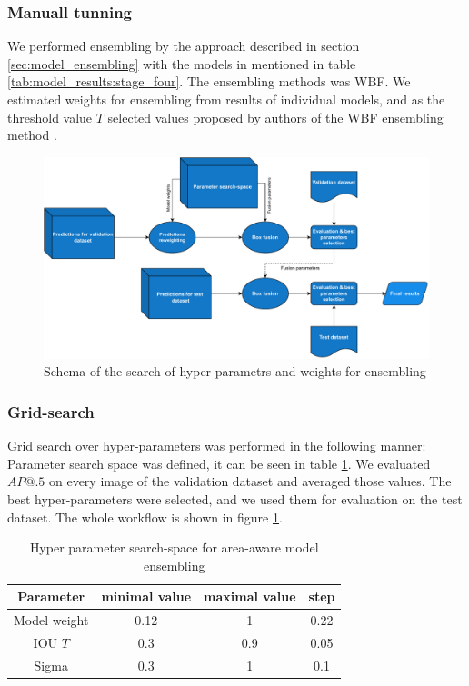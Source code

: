 \subsubsection{Manuall tunning}
We performed ensembling by the approach described in section \ref{sec:model_ensembling} with the models in mentioned in table \ref{tab:model_results:stage_four}. The ensembling methods was WBF. We estimated weights for ensembling from results of individual models, and as the threshold value $T$ selected values proposed by authors of the WBF ensembling method \cite{Solovyev2019}.


\begin{figure}[h]
    \centering
    \includegraphics[width=\linewidth]{images/ensemble_search_diag.drawio.pdf}
    \caption{Schema of the search of hyper-parametrs and weights for ensembling}
    \label{fig:diag:ense_search}
\end{figure}

\subsubsection{Grid-search}
\label{sec:ens_grid_search}
Grid search over hyper-parameters was performed in the following manner: Parameter search space was defined, it can be seen in table \ref{tab:ensembling_search_space}. We evaluated $AP@.5$ on every image of the validation dataset and averaged those values. The best hyper-parameters were selected, and we used them for evaluation on the test dataset. The whole workflow is shown in figure \ref{fig:diag:ense_search}.
\begin{table}
    \centering
    \begin{tabular}{|c|c|c|c|}
        \hline
        Parameter    & minimal value & maximal value & step \\ \hline
        Model weight & 0.12          & 1             & 0.22 \\ \hline
        IOU $T$      & 0.3           & 0.9           & 0.05 \\ \hline
        Sigma        & 0.3           & 1             & 0.1  \\ \hline
    \end{tabular}
    \caption{Hyper parameter search-space for area-aware model ensembling}
    \label{tab:ensembling_search_space}
\end{table}

